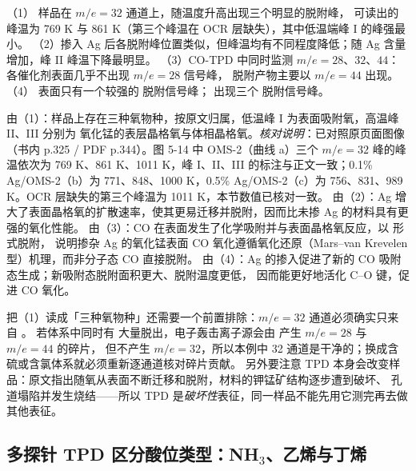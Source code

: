 \begin{example}
\begin{obs}
（1） 样品在 $m/e=32$ 通道上，随温度升高出现三个明显的脱附峰，
可读出的峰温为 769 K 与 861 K（第三个峰温在 OCR 层缺失），其中低温端峰 I 的峰强最小。
（2）掺入 Ag 后各脱附峰位置类似，但峰温均有不同程度降低；随 Ag 含量增加，峰 II 峰温下降最明显。
（3）CO-TPD 中同时监测 $m/e=28$、$32$、$44$：各催化剂表面几乎不出现 $m/e=28$ 信号峰，
脱附产物主要以 $m/e=44$ 出现。
（4） 表面只有一个较强的  脱附信号峰； 出现三个  脱附信号峰。
\end{obs}
\begin{infer}
由（1）：样品上存在三种氧物种，按原文归属，低温峰 I 为表面吸附氧，高温峰 II、III 分别为
氧化锰的表层晶格氧与体相晶格氧。\emph{核对说明}：已对照原页面图像（书内 p.325 / PDF p.344）。图 5-14 中 OMS-2（曲线 a）三个 $m/e=32$ 峰的峰温依次为 769 K、861 K、1011 K，峰 I、II、III 的标注与正文一致；0.1\% Ag/OMS-2（b）为 771、848、1000 K，0.5\% Ag/OMS-2（c）为 756、831、989 K。OCR 层缺失的第三个峰温为 1011 K，本节数值已核对一致。
由（2）：Ag 增大了表面晶格氧的扩散速率，使其更易迁移并脱附，因而比未掺 Ag 的材料具有更强的氧化性能。
由（3）：CO 在表面发生了化学吸附并与表面晶格氧反应，以  形式脱附，
说明掺杂 Ag 的氧化锰表面 CO 氧化遵循氧化还原（Mars--van Krevelen 型）机理，而非分子态 CO 直接脱附。
由（4）：Ag 的掺入促进了新的 CO 吸附态生成；新吸附态脱附面积更大、脱附温度更低，
因而能更好地活化 C--O 键，促进 CO 氧化。
\end{infer}
\end{example}

\begin{pitfall}
把（1）读成「三种氧物种」还需要一个前置排除：$m/e=32$ 通道必须确实只来自 。
若体系中同时有  大量脱出，电子轰击离子源会由  产生 $m/e=28$ 与 $m/e=44$ 的碎片，
但不产生 $m/e=32$，所以本例中 32 通道是干净的；换成含硫或含氯体系就必须重新逐通道核对碎片贡献。
另外要注意 TPD 本身会改变样品：原文指出随氧从表面不断迁移和脱附，材料的钾锰矿结构逐步遭到破坏、
孔道塌陷并发生烧结——所以 TPD 是\emph{破坏性}表征，同一样品不能先用它测完再去做其他表征。
\end{pitfall}

\subsection{多探针 TPD 区分酸位类型：\texorpdfstring{NH$_3$}{NH3}、乙烯与丁烯}
\label{sec:ch05b-probe}

